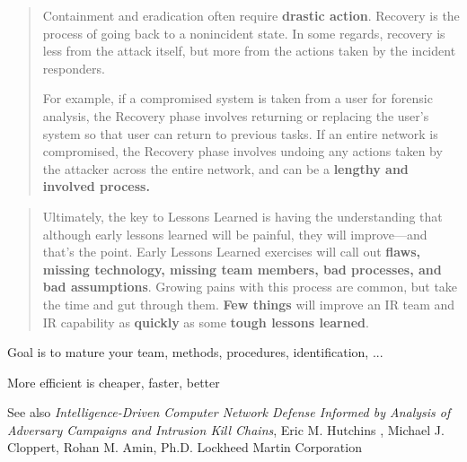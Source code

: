 \documentclass[Screen16to9,17pt]{foils}
\begin{document}


\begin{quote}
Containment and eradication often require {\bf drastic action}. Recovery is the process of going back to a nonincident state. In some regards, recovery is less from the attack itself, but more from the actions taken by the incident responders.

For example, if a compromised system is taken from a user for forensic analysis, the
Recovery phase involves returning or replacing the user’s system so that user can
return to previous tasks. If an entire network is compromised, the Recovery phase
involves undoing any actions taken by the attacker across the entire network, and can
be a {\bf lengthy and involved process.}
\end{quote}

\begin{list2}
    \item
\end{list2}



\begin{quote}
Ultimately, the key to Lessons Learned is having the understanding that although early lessons learned will be painful, they will improve—and that’s the point. Early Lessons Learned exercises will call out {\bf flaws, missing technology, missing team members, bad processes, and bad assumptions}. Growing pains with this process are common, but take the time and gut through them. {\bf Few things} will improve an IR team and IR capability as {\bf quickly} as some {\bf tough lessons learned}.
\end{quote}

\begin{list2}
\item Goal is to mature your team, methods, procedures, identification, ...
\item More efficient is cheaper, faster, better
\end{list2}



\begin{list2}
\item See also \emph{Intelligence-Driven Computer Network Defense Informed by Analysis of Adversary Campaigns and Intrusion Kill Chains}, Eric M. Hutchins , Michael J. Cloppert, Rohan M. Amin, Ph.D. Lockheed Martin Corporation\\{\footnotesize
 }
\end{list2}






\end{document}
